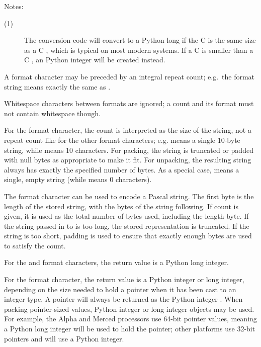 \noindent
Notes:

\begin{description}
\item[(1)]
  The  conversion code will convert to a Python long if
  the C  is the same size as a C , which is
  typical on most modern systems.  If a C  is smaller than
  a C , an Python integer will be created instead.
\end{description}


A format character may be preceded by an integral repeat count;
e.g.\ the format string  means exactly the same as
.

Whitespace characters between formats are ignored; a count and its
format must not contain whitespace though.

For the  format character, the count is interpreted as the
size of the string, not a repeat count like for the other format
characters; e.g.  means a single 10-byte string, while
 means 10 characters.  For packing, the string is
truncated or padded with null bytes as appropriate to make it fit.
For unpacking, the resulting string always has exactly the specified
number of bytes.  As a special case,  means a single, empty
string (while  means 0 characters).

The  format character can be used to encode a Pascal
string.  The first byte is the length of the stored string, with the
bytes of the string following.  If count is given, it is used as the
total number of bytes used, including the length byte.  If the string
passed in to  is too long, the stored representation
is truncated.  If the string is too short, padding is used to ensure
that exactly enough bytes are used to satisfy the count.

For the  and  format characters, the return
value is a Python long integer.

For the  format character, the return value is a Python
integer or long integer, depending on the size needed to hold a
pointer when it has been cast to an integer type.  A \NULL{} pointer will
always be returned as the Python integer . When packing pointer-sized
values, Python integer or long integer objects may be used.  For
example, the Alpha and Merced processors use 64-bit pointer values,
meaning a Python long integer will be used to hold the pointer; other
platforms use 32-bit pointers and will use a Python integer.

